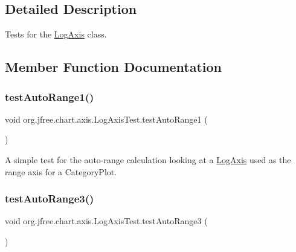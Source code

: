 \subsection{Detailed Description}
Tests for the \mbox{\hyperlink{classorg_1_1jfree_1_1chart_1_1axis_1_1_log_axis}{Log\+Axis}} class. 

\subsection{Member Function Documentation}
\mbox{\label{classorg_1_1jfree_1_1chart_1_1axis_1_1_log_axis_test_adc01174c255ae807a0d2ad210896064e}} 
\subsubsection{\texorpdfstring{test\+Auto\+Range1()}{testAutoRange1()}}
{\footnotesize\ttfamily void org.\+jfree.\+chart.\+axis.\+Log\+Axis\+Test.\+test\+Auto\+Range1 (\begin{DoxyParamCaption}{ }\end{DoxyParamCaption})}

A simple test for the auto-\/range calculation looking at a \mbox{\hyperlink{classorg_1_1jfree_1_1chart_1_1axis_1_1_log_axis}{Log\+Axis}} used as the range axis for a Category\+Plot. \mbox{\label{classorg_1_1jfree_1_1chart_1_1axis_1_1_log_axis_test_ab99b4812ed56569aea8daf523cf9a535}} 
\subsubsection{\texorpdfstring{test\+Auto\+Range3()}{testAutoRange3()}}
{\footnotesize\ttfamily void org.\+jfree.\+chart.\+axis.\+Log\+Axis\+Test.\+test\+Auto\+Range3 (\begin{DoxyParamCaption}{ }\end{DoxyParamCaption})}

